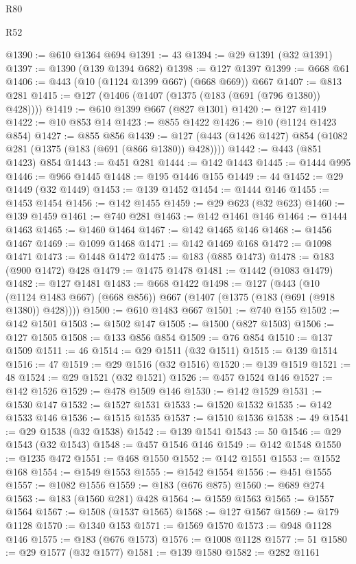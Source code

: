 \begin{lexlean}{R80}
\begin{lexlean}{R52}
\begin{coremodule}
{{{{{{{{{{{{{{{{{{{{{{{{{{{{{{{{{{{{{{{{{{{{{{{{{{{{{{{{{{{{{{{{{{{{{{{{{{{{{{{{{{{{{{{{{{{{{{{{{{{{{{{{{{{{{{{{{{{{{{{{{{{{{{{{{{{{{{{{{{{{{{{{{{{{{{{{{{{{{{{{{{{{{{{{{{{{{{{{{{{{{{{{{{{{{{{{{{{{{{@1390 := @610 @1364 @694
@1391 := 43
@1394 := @29 @1391 (@32 @1391)
@1397 := @1390 (@139 @1394 @682)
@1398 := @127 @1397
@1399 := @668 @61
@1406 := @443 (@10 (@1124 @1399 @667) (@668 @669)) @667
@1407 := @813 @281
@1415 := @127 (@1406 (@1407 (@1375 (@183 (@691 (@796 @1380)) @428))))
@1419 := @610 @1399 @667 (@827 @1301)
@1420 := @127 @1419
@1422 := @10 @853 @14
@1423 := @855 @1422
@1426 := @10 (@1124 @1423 @854)
@1427 := @855 @856
@1439 := @127 (@443 (@1426 @1427) @854 (@1082 @281 (@1375 (@183 (@691 (@866 @1380)) @428))))
@1442 := @443 (@851 @1423) @854
@1443 := @451 @281
@1444 := @142 @1443
@1445 := @1444 @995
@1446 := @966 @1445
@1448 := @195 @1446 @155
@1449 := 44
@1452 := @29 @1449 (@32 @1449)
@1453 := @139 @1452
@1454 := @1444 @146
@1455 := @1453 @1454
@1456 := @142 @1455
@1459 := @29 @623 (@32 @623)
@1460 := @139 @1459
@1461 := @740 @281
@1463 := @142 @1461 @146
@1464 := @1444 @1463
@1465 := @1460 @1464
@1467 := @142 @1465 @146
@1468 := @1456 @1467
@1469 := @1099 @1468
@1471 := @142 @1469 @168
@1472 := @1098 @1471
@1473 := @1448 @1472
@1475 := @183 (@885 @1473)
@1478 := @183 (@900 @1472) @428
@1479 := @1475 @1478
@1481 := @1442 (@1083 @1479)
@1482 := @127 @1481
@1483 := @668 @1422
@1498 := @127
    (@443 (@10 (@1124 @1483 @667) (@668 @856)) @667 (@1407 (@1375 (@183 (@691 (@918 @1380)) @428))))
@1500 := @610 @1483 @667
@1501 := @740 @155
@1502 := @142 @1501
@1503 := @1502 @147
@1505 := @1500 (@827 @1503)
@1506 := @127 @1505
@1508 := @133 @856 @854
@1509 := @76 @854
@1510 := @137 @1509
@1511 := 46
@1514 := @29 @1511 (@32 @1511)
@1515 := @139 @1514
@1516 := 47
@1519 := @29 @1516 (@32 @1516)
@1520 := @139 @1519
@1521 := 48
@1524 := @29 @1521 (@32 @1521)
@1526 := @457 @1524 @146
@1527 := @142 @1526
@1529 := @478 @1509 @146
@1530 := @142 @1529
@1531 := @1530 @147
@1532 := @1527 @1531
@1533 := @1520 @1532
@1535 := @142 @1533 @146
@1536 := @1515 @1535
@1537 := @1510 @1536
@1538 := 49
@1541 := @29 @1538 (@32 @1538)
@1542 := @139 @1541
@1543 := 50
@1546 := @29 @1543 (@32 @1543)
@1548 := @457 @1546 @146
@1549 := @142 @1548
@1550 := @1235 @472
@1551 := @468 @1550
@1552 := @142 @1551
@1553 := @1552 @168
@1554 := @1549 @1553
@1555 := @1542 @1554
@1556 := @451 @1555
@1557 := @1082 @1556
@1559 := @183 (@676 @875)
@1560 := @689 @274
@1563 := @183 (@1560 @281) @428
@1564 := @1559 @1563
@1565 := @1557 @1564
@1567 := @1508 (@1537 @1565)
@1568 := @127 @1567
@1569 := @179 @1128
@1570 := @1340 @153
@1571 := @1569 @1570
@1573 := @948 @1128 @146
@1575 := @183 (@676 @1573)
@1576 := @1008 @1128
@1577 := 51
@1580 := @29 @1577 (@32 @1577)
@1581 := @139 @1580
@1582 := @282 @1161
}}}}}}}}}}}}}}}}}}}}}}}}}}}}}}}}}}}}}}}}}}}}}}}}}}}}}}}}}}}}}}}}}}}}}}}}}}}}}}}}}}}}}}}}}}}}}}}}}}}}}}}}}}}}}}}}}}}}}}}}}}}}}}}}}}}}}}}}}}}}}}}}}}}}}}}}}}}}}}}}}}}}}}}}}}}}}}}}}}}}}}}}}}}}}}}}}}}}}}
\end{coremodule}
\end{lexlean}
\end{lexlean}
